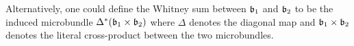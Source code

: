 \begin{myparagraph}
    Alternatively, one could define the Whitney sum between $\bb_1$ and $\bb_2$
    to be the induced microbundle $\ind{\Delta}(\bb_1 \cross \bb_2)$
    where $\Delta$ denotes the diagonal map and $\bb_1 \cross \bb_2$
    denotes the literal cross-product between the two microbundles.
\end{myparagraph}